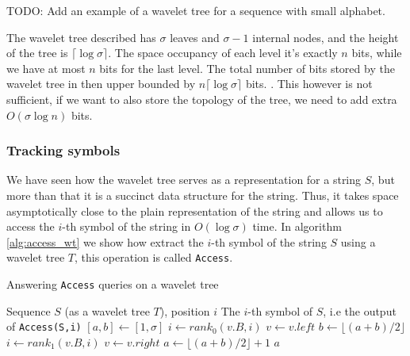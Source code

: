 \begin{example}
    TODO: Add an example of a wavelet tree for a sequence with small alphabet.
\end{example}

\begin{remark} \label{rem:space_occupancy_wavelet_tree}
    The wavelet tree described has $\sigma$ leaves and $\sigma-1$ internal nodes, and the height of the tree is $ \lceil \log \sigma \rceil$. The space occupancy of each level it's exactly $n$ bits, while we have at most $n$ bits for the last level. The total number of bits stored by the wavelet tree in then upper bounded by $n \lceil \log \sigma \rceil$ bits. \cite{WTForALL}. This however is not sufficient, if we want to also store the topology of the tree, we need to add extra $O(\sigma \log n)$ bits.
\end{remark}

\subsubsection*{Tracking symbols}
We have seen how the wavelet tree serves as a representation for a string $S$, but more than that it is a succinct data structure for the string. Thus, it takes space asymptotically close to the plain representation of the string and allows us to access the $i$-th symbol of the string in $O(\log \sigma)$ time. In algorithm \ref{alg:access_wt} we show how extract the $i$-th symbol of the string $S$ using a wavelet tree $T$, this operation is called \texttt{Access}. \\

\begin{algorithm}[h!]
    \caption{Answering \texttt{Access} queries on a wavelet tree}\label{alg:access_wt}
    \begin{algorithmic}
        \Require Sequence $S$ (as a wavelet tree $T$), position $i$
        \Ensure The $i$-th symbol of $S$, i.e the output of \texttt{Access(S,i)}
        \State $[a,b] \gets [1,\sigma]$
         
            \State $i \gets rank_0(v.B,i)$
            \State $v \gets v.left$ 
            \State $b \gets \lfloor (a+b)/2 \rfloor$
        \Else
            \State $i \gets rank_1(v.B,i)$
            \State $v \gets v.right$ 
            \State $a \gets \lfloor (a+b)/2 \rfloor +1$
        \EndIf
        \EndWhile
        \State \Return $a$
    \end{algorithmic}
\end{algorithm}

